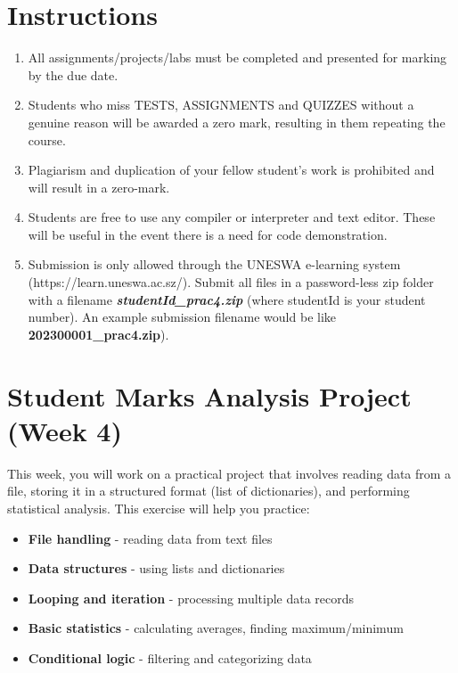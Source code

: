\documentclass[a4paper,11pt]{article}
\theoremstyle{mytheor}
\begin{document}
\section*{Instructions} 
\begin{enumerate}
    \item All assignments/projects/labs must be completed and presented for marking by the due date. 
    \item Students who miss TESTS, ASSIGNMENTS and QUIZZES without a genuine reason will be awarded a zero mark, resulting in them repeating the course.
    \item Plagiarism and duplication of your fellow student's work is prohibited and will result in a zero-mark.
    \item Students are free to use any compiler or interpreter and text editor. These will be useful in the event there is a need for code demonstration. 
    \item Submission is only allowed through the UNESWA e-learning system (https://learn.uneswa.ac.sz/). Submit all files in a password-less zip folder with a filename \textbf{\textit{studentId\_prac4.zip}} (where studentId is your student number). An example submission filename would be like \textbf{202300001\_prac4.zip}).
\end{enumerate} 
  
\section*{Student Marks Analysis Project (Week 4)}

This week, you will work on a practical project that involves reading data from a file, storing it in a structured format (list of dictionaries), and performing statistical analysis. This exercise will help you practice:

\begin{itemize}
    \item \textbf{File handling} - reading data from text files
    \item \textbf{Data structures} - using lists and dictionaries
    \item \textbf{Looping and iteration} - processing multiple data records
    \item \textbf{Basic statistics} - calculating averages, finding maximum/minimum
    \item \textbf{Conditional logic} - filtering and categorizing data
\end{itemize}
\end{document}
